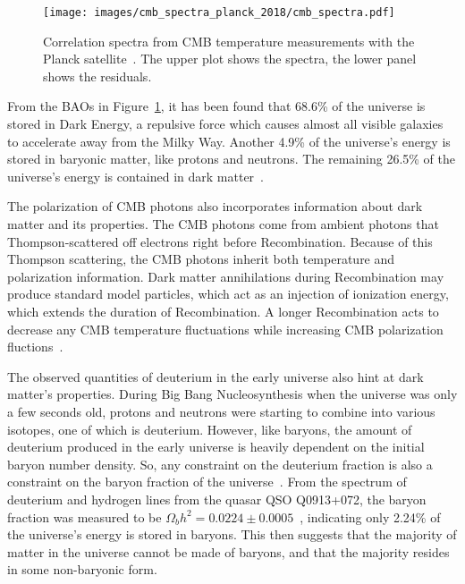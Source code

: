     \begin{figure}[ht]
      \centering
      \texttt{[image: images/cmb\_spectra\_planck\_2018/cmb\_spectra.pdf]}
      \caption[Cosmic Micrwave Background Correlation Spectrum]{
        Correlation spectra from CMB temperature measurements with the Planck satellite~\cite{planck_dm_limit}.
        The upper plot shows the spectra, the lower panel shows the residuals.
      }
      \label{fig:cmb_correlation_spectra}
    \end{figure}
    
    From the BAOs in Figure~\ref{fig:cmb_correlation_spectra}, it has been found that 68.6\% of the universe is stored in Dark Energy, a repulsive force which causes almost all visible galaxies to accelerate away from the Milky Way.
    Another 4.9\% of the universe's energy is stored in baryonic matter, like protons and neutrons.
    The remaining 26.5\% of the universe's energy is contained in dark matter~\cite{planck2015}.
    
    The polarization of CMB photons also incorporates information about dark matter and its properties.
    The CMB photons come from ambient photons that Thompson-scattered off electrons right before Recombination.
    Because of this Thompson scattering, the CMB photons inherit both temperature and polarization information.
    Dark matter annihilations during Recombination may produce standard model particles, which act as an injection of ionization energy, which extends the duration of Recombination.
    A longer Recombination acts to decrease any CMB temperature fluctuations while increasing CMB polarization fluctions~\cite{cmb_polarization1,cmb_polarization2}.
    
    The observed quantities of deuterium in the early universe also hint at dark matter's properties.
    During Big Bang Nucleosynthesis when the universe was only a few seconds old, protons and neutrons were starting to combine into various isotopes, one of which is deuterium.
    However, like baryons, the amount of deuterium produced in the early universe is heavily dependent on the initial baryon number density.
    So, any constraint on the deuterium fraction is also a constraint on the baryon fraction of the universe~\cite{deuterium1,deuterium2}.
    From the spectrum of deuterium and hydrogen lines from the quasar QSO Q0913+072, the baryon fraction was measured to be $\Omega_{b}h^2 = 0.0224 \pm 0.0005$~\cite{deuterium3}, indicating only 2.24\% of the universe's energy is stored in baryons.
    This then suggests that the majority of matter in the universe cannot be made of baryons, and that the majority resides in some non-baryonic form.
    
